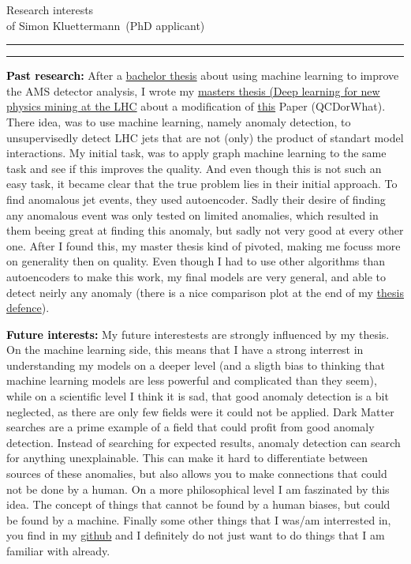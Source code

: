 \documentclass{article}
\newcommand{\soptitle}{Research interests}
\newcommand{\yourname}{Simon Kluettermann}
\newcommand{\statement}[1]{\par\medskip
  \textcolor{black}{\textbf{#1:}}\space
}
\begin{document}
\begin{center}\LARGE\soptitle\\
\large of \yourname\ (PhD applicant)
\end{center}

\hrule
\vspace{1pt}
\hrule height 1pt

\bigskip

\statement{Past research}After a \href{https://psorus.de/s/abstract_bachelor.html}{bachelor thesis} about using machine learning to improve the AMS detector analysis, I wrote my \textcolor{blue}{\href{https://psorus.de/s/abstract_master.html}{masters thesis (Deep learning for new physics mining at the LHC}} about a modification of \textcolor{blue}{\href{https://arxiv.org/abs/1808.08979}{this}} Paper (QCDorWhat). There idea, was to use machine learning, namely anomaly detection, to unsupervisedly detect LHC jets that are not (only) the product of standart model interactions. My initial task, was to apply graph machine learning to the same task and see if this improves the quality. And even though this is not such an easy task, it became clear that the true problem lies in their initial approach. To find anomalous jet events, they used autoencoder. Sadly their desire of finding any anomalous event was only tested on limited anomalies, which resulted in them beeing great at finding this anomaly, but sadly not very good at every other one. After I found this, my master thesis kind of pivoted, making me focuss more on generality then on quality. Even though I had to use other algorithms than autoencoders to make this work, my final models are very general, and able to detect neirly any anomaly (there is a nice comparison plot at the end of my \textcolor{blue}{\href{https://grapa.readthedocs.io/en/latest/thesisdown.html}{thesis defence}}).
\statement{Future interests}My future interestests are strongly influenced by my thesis. On the machine learning side, this means that I have a strong interrest in understanding my models on a deeper level (and a sligth bias to thinking that machine learning models are less powerful and complicated than they seem), while on a scientific level I think it is sad, that good anomaly detection is a bit neglected, as there are only few fields were it could not be applied. Dark Matter searches are a prime example of a field that could profit from good anomaly detection. Instead of searching for expected results, anomaly detection can search for anything unexplainable. This can make it hard to differentiate between sources of these anomalies, but also allows you to make connections that could not be done by a human. On a more philosophical level I am faszinated by this idea. The concept of things that cannot be found by a human biases, but could be found by a machine. Finally some other things that I was/am interrested in, you find in my \textcolor{blue}{\href{https://github.com/psorus}{github}} and I definitely do not just want to do things that I am familiar with already.
\end{document}
